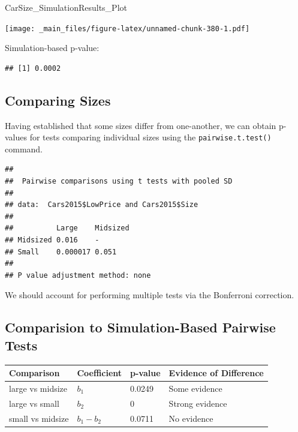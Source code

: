\documentclass[]{book}
\newenvironment{Shaded}{\begin{snugshade}}{\end{snugshade}}
\newcommand{\KeywordTok}[1]{\textcolor[rgb]{0.13,0.29,0.53}{\textbf{#1}}}
\newcommand{\DataTypeTok}[1]{\textcolor[rgb]{0.13,0.29,0.53}{#1}}
\newcommand{\StringTok}[1]{\textcolor[rgb]{0.31,0.60,0.02}{#1}}
\newcommand{\OperatorTok}[1]{\textcolor[rgb]{0.81,0.36,0.00}{\textbf{#1}}}
\newcommand{\NormalTok}[1]{#1}
\begin{document}
\begin{Shaded}
\begin{Highlighting}[]
\NormalTok{CarSize_SimulationResults_Plot}
\end{Highlighting}
\end{Shaded}

\texttt{[image: \_main\_files/figure-latex/unnamed-chunk-380-1.pdf]}

Simulation-based p-value:

\begin{verbatim}
## [1] 0.0002
\end{verbatim}

\subsection{Comparing Sizes}\label{comparing-sizes}

Having established that some sizes differ from one-another, we can
obtain p-values for tests comparing individual sizes using the
\texttt{pairwise.t.test()} command.

\begin{Shaded}
\end{Shaded}

\begin{verbatim}
## 
##  Pairwise comparisons using t tests with pooled SD 
## 
## data:  Cars2015$LowPrice and Cars2015$Size 
## 
##          Large    Midsized
## Midsized 0.016    -       
## Small    0.000017 0.051   
## 
## P value adjustment method: none
\end{verbatim}

We should account for performing multiple tests via the Bonferroni
correction.

\subsection{Comparision to Simulation-Based Pairwise
Tests}\label{comparision-to-simulation-based-pairwise-tests}

\begin{longtable}[]{@{}llll@{}}
\toprule
Comparison & Coefficient & p-value & Evidence of
Difference\tabularnewline
\midrule
\endhead
large vs midsize & \(b_1\) & 0.0249 & Some evidence\tabularnewline
large vs small & \(b_2\) & 0 & Strong evidence\tabularnewline
small vs midsize & \(b_1-b_2\) & 0.0711 & No evidence\tabularnewline
\bottomrule
\end{longtable}
\end{document}
